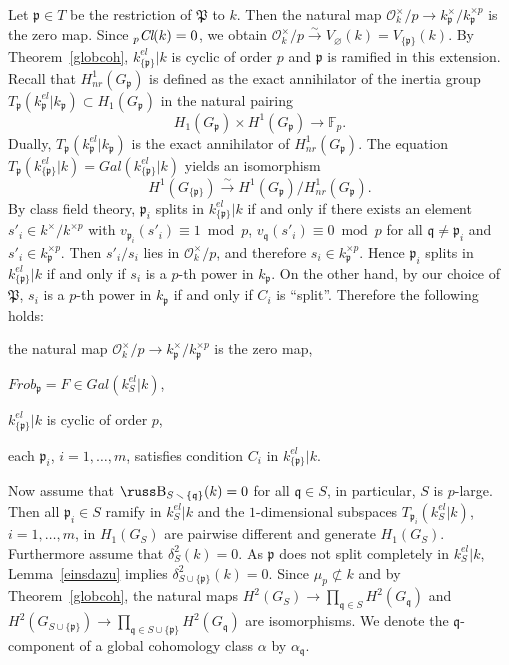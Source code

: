 \documentclass[10pt]{article}
\def\mapr#1{\stackrel{#1}{\longrightarrow}}
\newcommand{\F}{{\mathbb F}}
\newcommand{\Frob}{{\mathit{Frob}}}
\renewcommand{\O}{{\mathcal{O}}}
\newcommand{\Cl}{\text{\it Cl}}
\newcommand{\p}{{\mathfrak p}}
\newcommand{\q}{{\mathfrak q}}
\newcommand{\sm}{{\,\smallsetminus\,}}
\newcommand{\nr}{\mathit{nr}}
\renewcommand{\P}{\mathfrak{P}}
\def\Be{\hbox{\russ\char66}}
\theoremstyle{alex}
\theoremstyle{alexdef}
\begin{document}
\medskip\noindent
Let $\p\in T$ be the restriction of $\P$ to $k$. Then the natural map
$\O_k^\times/p \to k_\p^\times/k_\p^{\times p}$ is the zero map. Since $_p\Cl(k)=0$,  we obtain $\O_k^\times/p \stackrel{\sim}{\to} V_\varnothing(k)=V_{\{\p\}}(k)$. By Theorem~\ref{globcoh}, $k_{\{\p\}}^{el}|k$ is cyclic of order $p$ and $\p$ is ramified in this extension.
Recall that $H^1_\nr(G_\p)$ is defined as the exact annihilator of the inertia group $T_\p(k_\p^{el}|k_\p)\subset H_1(G_\p)$ in the natural pairing
\[
H_1(G_\p) \times H^1(G_\p) \longrightarrow \F_p.
\]
Dually, $T_\p(k_\p^{el}|k_\p)$ is the exact annihilator of $H^1_\nr(G_\p)$. The equation $T_\p(k_{\{\p\}}^{el}|k)=Gal(k_{\{\p\}}^{el}|k)$
yields an isomorphism
\[
 H^1(G_{\{\p\}}) \mapr{\sim} H^1(G_\p)/H^1_\nr(G_\p).
\]
By class field theory, $\p_i$ splits in $k_{\{\p\}}^{el}|k$ if and only if there exists an element $s'_i\in k^\times/k^{\times p}$ with $v_{\p_i}(s'_i)\equiv 1 \bmod p$, $v_\q(s'_i)\equiv 0 \bmod p$ for all $\q\neq \p_i$ and $s'_i\in k_\p^{\times p}$.
Then $s'_i/s_i$ lies in $\O_k^\times/p$, and therefore $s_i\in k_\p^{\times p}$.
Hence $\p_i$ splits in $k_{\{\p\}}^{el}|k$ if and only if $s_i$ is a $p$-th power in $k_\p$.
On the other hand,  by our choice of $\P$,  $s_i$ is a $p$-th power in $k_\p$ if and only if $C_i$ is ``split''. Therefore the following holds:

\medskip\noindent
\begin{compactitem}
\item the natural map $\O_k^\times/p\to k_\p^\times/k_\p^{\times p}$ is the zero map,
\item $\Frob_\p=F \in Gal(k_S^{el}|k)$,
\item $k_{\{\p\}}^{el}|k$ is cyclic of order $p$,
\item  each $\p_i$, $i=1,\ldots,m$, satisfies condition $C_i$ in $k_{\{\p\}}^{el}|k$.
\end{compactitem}

\medskip\noindent
Now assume that $\Be_{S\sm \{\q\}}(k)=0$ for all $\q\in S$, in particular, $S$ is $p$-large.
Then all $\p_i\in S$ ramify in $k_S^{el}|k$ and the $1$-dimensional subspaces $T_{\p_i}(k_S^{el}|k)$, $i=1,\ldots,m$, in $H_1(G_S)$ are pairwise different and generate $H_1(G_S)$.
Furthermore assume that  $\delta_S^2(k)=0$. As $\p$ does not split completely in $k_S^{el}|k$,  Lemma~\ref{einsdazu} implies $\delta_{S\cup \{\p\}}^2(k)=0$.
Since $\mu_p\not\subset k$ and by Theorem~\ref{globcoh}, the natural maps $H^2(G_S) \to \prod_{\q\in S} H^2(G_\q)$ and $H^2(G_{S\cup \{\p\}}) \to \prod_{\q\in S\cup \{\p\}} H^2(G_\q)$ are isomorphisms. We denote the $\q$-component of a global cohomology class $\alpha$ by $\alpha_\q$.
\end{document}
